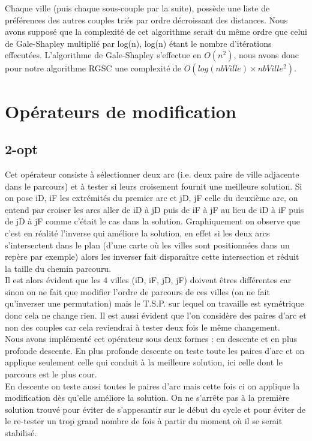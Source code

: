 \documentclass[12pt,a4paper]{article}
\begin{document}
Chaque ville (puis chaque sous-couple par la suite), possède une liste de préférences des autres couples triés par ordre décroissant des distances. Nous avons supposé que la complexité de cet algorithme serait du même ordre que celui de Gale-Shapley multiplié par log(n), log(n) étant le nombre d'itérations effecutées. L'algorithme de Gale-Shapley s'effectue en $O(n^2)$, nous avons donc pour notre algorithme RGSC une complexité de $O(log(nbVille) \times nbVille ^2)$.\\

\section{Opérateurs de modification}
\subsection{2-opt}

Cet opérateur consiste à sélectionner deux arc (i.e. deux paire de ville adjacente dans le parcours) et à tester si leurs croisement fournit une meilleure solution. Si on pose iD, iF les extrémités du premier arc et jD, jF celle du deuxième arc, on entend par croiser les arcs aller de iD à jD puis de iF à jF au lieu de iD à iF puis de jD à jF comme c’était le cas dans la solution. Graphiquement on observe que c'est en réalité l'inverse qui améliore la solution, en effet si les deux arcs s’intersectent dans le plan (d'une carte où les villes sont positionnées dans un repère par exemple) alors les inverser fait disparaître cette intersection et réduit la taille du chemin parcouru.\\

Il est alors évident que les 4 villes (iD, iF, jD, jF) doivent êtres différentes car sinon on ne fait que modifier l'ordre de parcours de ces villes (on ne fait qu'inverser une permutation) mais le T.S.P. sur lequel on travaille est symétrique donc cela ne change rien. Il est aussi évident que l'on considère des paires d'arc et non des couples car cela reviendrai à tester deux fois le même changement.\\

Nous avons implémenté cet opérateur sous deux formes : en descente et en plus profonde descente.
En plus profonde descente on teste toute les paires d'arc et on applique seulement celle qui conduit à la meilleure solution, ici celle dont le parcours est le plus cour.\\

En descente on teste aussi toutes le paires d'arc mais cette fois ci on applique la modification dès qu'elle améliore la solution. On ne s’arrête pas à la première solution trouvé pour éviter de s'appesantir sur le début du cycle et pour éviter de le re-tester un trop grand nombre de fois à partir du moment où il se serait stabilisé.\\
\end{document}
